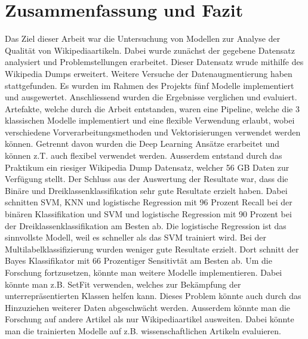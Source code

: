 \section{Zusammenfassung und Fazit}
\label{ZusammenfassungUndFazit}
Das Ziel dieser Arbeit war die Untersuchung von Modellen zur Analyse der Qualität von Wikipediaartikeln. Dabei wurde zunächst der gegebene Datensatz analysiert und Problemstellungen erarbeitet. Dieser Datensatz wrude mithilfe des Wikipedia Dumps erweitert. Weitere Versuche der Datenaugmentierung haben stattgefunden. Es wurden im Rahmen des Projekts fünf Modelle implementiert und ausgewertet. Anschliessend wurden die Ergebnisse verglichen und evaluiert. Artefakte, welche durch die Arbeit entstanden, waren eine Pipeline, welche die 3 klassischen Modelle implementiert und eine flexible Verwendung erlaubt, wobei verschiedene Vorverarbeitungsmethoden und Vektorisierungen verwendet werden können. Getrennt davon wurden die Deep Learning Ansätze erarbeitet und können z.T. auch flexibel verwendet werden. Ausserdem entstand durch das Praktikum ein riesiger Wikipedia Dump Datensatz, welcher 56 GB Daten zur Verfügung stellt.
Der Schluss aus der Auswertung der Resultate war, dass die Binäre und Dreiklassenklassifikation sehr gute Resultate erzielt haben. Dabei schnitten SVM, KNN und logistische Regression mit 96 Prozent Recall bei der binären Klassifikation und SVM und logistische Regression mit 90 Prozent bei der Dreiklassenklassifikation am Besten ab. Die logistische Regression ist das sinnvollste Modell, weil es schneller als das SVM trainiert wird. Bei der Multilabelklassifizierung wurden weniger gute Resultate erzielt. Dort schnitt der Bayes Klassifikator mit 66 Prozentiger Sensitivtät am Besten ab. Um die Forschung fortzusetzen, könnte man weitere Modelle implementieren. Dabei könnte man z.B. SetFit verwenden, welches zur Bekämpfung der unterrepräsentierten Klassen helfen kann. Dieses Problem könnte auch durch das Hinzuziehen weiterer Daten abgeschwächt werden. Ausserdem könnte man die Forschung auf andere Artikel als nur Wikipediaartikel ausweiten. Dabei könnte man die trainierten Modelle auf z.B. wissenschaftlichen Artikeln evaluieren. 